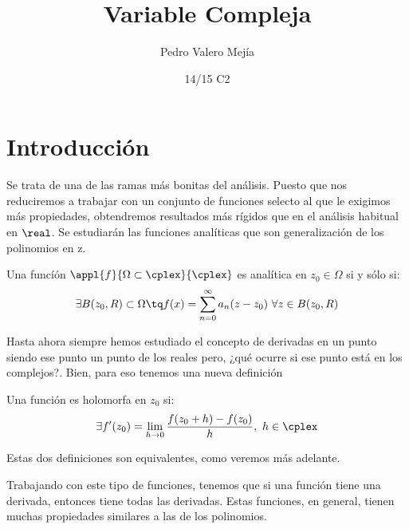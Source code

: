 \documentclass{apuntes}
\title{Variable Compleja}
\author{Pedro Valero Mejía}
\date{14/15 C2}
\begin{document}
\pagestyle{plain}
\maketitle

\tableofcontents
\newpage
\chapter{Introducción}
Se trata de una de las ramas más bonitas del análisis. Puesto que nos reduciremos a trabajar con un conjunto de funciones selecto al que le exigimos más propiedades, obtendremos resultados más rígidos que en el análisis habitual en $\real$. Se estudiarán las funciones analíticas que son generalización de los polinomios en z.

\begin{defn}
Una funcíón $\appl{f}{\Omega \subset \cplex}{\cplex}$ es analítica en $z_0\in\Omega$ si y sólo si:
\[\exists B(z_0,R)\subset \Omega \tq f(x)=\sum_{n=0}^{\infty}a_n(z-z_0) \ \forall z \in B(z_0, R)\]
\end{defn}

Hasta ahora siempre hemos estudiado el concepto de derivadas en un punto siendo ese punto un punto de los reales pero, ¿qué ocurre si ese punto está en los complejos?. Bien, para eso tenemos una nueva definición

\begin{defn}
Una función es holomorfa en $z_0$ si:
\[\exists f'(z_0)=\lim_{h \to 0}\frac{f(z_0+h)-f(z_0)}{h}, \ h \in \cplex\]
\end{defn}

Estas dos definiciones son equivalentes, como veremos más adelante.

Trabajando con este tipo de funciones, tenemos que si una función tiene una derivada, entonces tiene todas las derivadas. Estas funciones, en general, tienen muchas propiedades similares a las de los polinomios.
\end{document}
